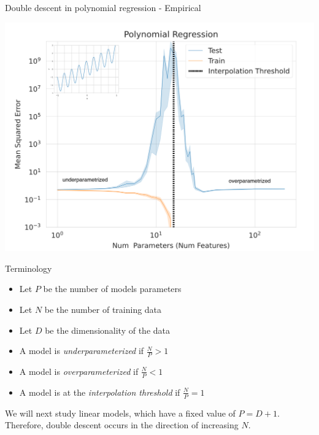 \documentclass{beamer}
\begin{document}
\begin{frame}{Double descent in polynomial regression - Empirical}
\begin{center}
\includegraphics[scale=0.22]{polyreg.png}
\end{center}
\end{frame}


\begin{frame}{Terminology}
    \begin{itemize}
        \item Let $P$ be the number of models parameters
        \item Let $N$ be the number of training data
        \item Let $D$ be the dimensionality of the data
    \end{itemize}
    
    \pause
    
    \begin{itemize}
        \item A model is \emph{underparameterized} if $\frac{N}{P} > 1$
        \item A model is \emph{overparameterized} if $\frac{N}{P} < 1$
        \item A model is at the \emph{interpolation threshold} if $\frac{N}{P} = 1$
    \end{itemize}
    
    \pause
    We will next study linear models, which have a fixed value of $P=D+1$. Therefore, double descent occurs in the direction of increasing $N$.

\end{frame}
\end{document}
